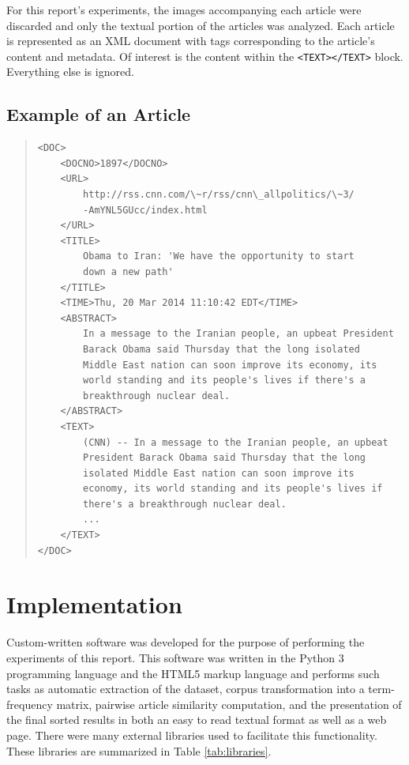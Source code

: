 \documentclass[11pt]{article}
\begin{document}
For this report's experiments, the images accompanying each article were discarded and only the textual portion of the articles was analyzed.
Each article is represented as an XML document with tags corresponding to the article's content and metadata.
Of interest is the content within the \texttt{<TEXT></TEXT>} block.
Everything else is ignored.

\pagebreak
\subsection{Example of an Article}

\small 
\begin{quote} \label{samplearticle}
\begin{verbatim}
<DOC>
    <DOCNO>1897</DOCNO>
    <URL>
        http://rss.cnn.com/\~r/rss/cnn\_allpolitics/\~3/
        -AmYNL5GUcc/index.html
    </URL>
    <TITLE>
        Obama to Iran: 'We have the opportunity to start
        down a new path'
    </TITLE>
    <TIME>Thu, 20 Mar 2014 11:10:42 EDT</TIME>
    <ABSTRACT>
        In a message to the Iranian people, an upbeat President
        Barack Obama said Thursday that the long isolated
        Middle East nation can soon improve its economy, its
        world standing and its people's lives if there's a
        breakthrough nuclear deal.
    </ABSTRACT>
    <TEXT>
        (CNN) -- In a message to the Iranian people, an upbeat
        President Barack Obama said Thursday that the long
        isolated Middle East nation can soon improve its
        economy, its world standing and its people's lives if
        there's a breakthrough nuclear deal.
        ...
    </TEXT>
</DOC>
\end{verbatim}
\end{quote}
\normalsize


\section{Implementation} \label{sec:software}

Custom-written software was developed for the purpose of performing the experiments of this report. This software was written in the Python 3 programming language and the HTML5 markup language and performs such tasks as automatic extraction of the dataset, corpus transformation into a term-frequency matrix, pairwise article similarity computation, and the presentation of the final sorted results in both an easy to read textual format as well as a web page.
There were many external libraries used to facilitate this functionality.
These libraries are summarized in Table \ref{tab:libraries}.
\end{document}
